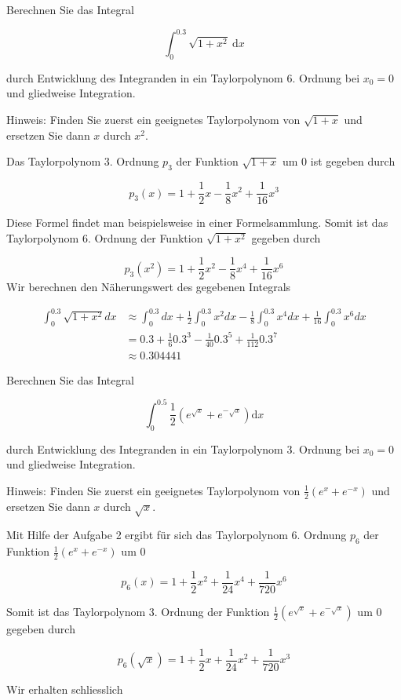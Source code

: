 \begin{example}
    Berechnen Sie das Integral

$$
\int_{0}^{0.3} \sqrt{1+x^{2}} \mathrm{~d} x
$$

durch Entwicklung des Integranden in ein Taylorpolynom 6. Ordnung bei $x_{0}=0$ und gliedweise Integration.

Hinweis: Finden Sie zuerst ein geeignetes Taylorpolynom von $\sqrt{1+x}$ und ersetzen Sie dann $x$ durch $x^{2}$.

\tcblower
Das Taylorpolynom 3. Ordnung $p_{3}$ der Funktion $\sqrt{1+x}$ um 0 ist gegeben durch

$$
p_{3}(x)=1+\frac{1}{2} x-\frac{1}{8} x^{2}+\frac{1}{16} x^{3}
$$

Diese Formel findet man beispielsweise in einer Formelsammlung. Somit ist das Taylorpolynom 6. Ordnung der Funktion $\sqrt{1+x^{2}}$ gegeben durch

$$
p_{3}\left(x^{2}\right)=1+\frac{1}{2} x^{2}-\frac{1}{8} x^{4}+\frac{1}{16} x^{6}
$$
Wir berechnen den Näherungswert des gegebenen Integrals

$$
\begin{aligned}
\int_{0}^{0.3} \sqrt{1+x^{2}} d x & \approx \int_{0}^{0.3} d x+\frac{1}{2} \int_{0}^{0.3} x^{2} d x-\frac{1}{8} \int_{0}^{0.3} x^{4} d x+\frac{1}{16} \int_{0}^{0.3} x^{6} d x \\
& =0.3+\frac{1}{6} 0.3^{3}-\frac{1}{40} 0.3^{5}+\frac{1}{112} 0.3^{7} \\
& \approx 0.304441
\end{aligned}
$$
\end{example}


\begin{example}
    Berechnen Sie das Integral

$$
\int_{0}^{0.5} \frac{1}{2}\left(e^{\sqrt{x}}+e^{-\sqrt{x}}\right) \mathrm{d} x
$$

durch Entwicklung des Integranden in ein Taylorpolynom 3. Ordnung bei $x_{0}=0$ und gliedweise Integration.

Hinweis: Finden Sie zuerst ein geeignetes Taylorpolynom von $\frac{1}{2}\left(e^{x}+e^{-x}\right)$ und ersetzen Sie dann $x$ durch $\sqrt{x}$.

\tcblower
Mit Hilfe der Aufgabe 2 ergibt für sich das Taylorpolynom 6. Ordnung $p_{6}$ der Funktion $\frac{1}{2}\left(e^{x}+e^{-x}\right)$ um 0

$$
p_{6}(x)=1+\frac{1}{2} x^{2}+\frac{1}{24} x^{4}+\frac{1}{720} x^{6}
$$

Somit ist das Taylorpolynom 3. Ordnung der Funktion $\frac{1}{2}\left(e^{\sqrt{x}}+e^{-\sqrt{x}}\right)$ um 0 gegeben durch

$$
p_{6}(\sqrt{x})=1+\frac{1}{2} x+\frac{1}{24} x^{2}+\frac{1}{720} x^{3}
$$

Wir erhalten schliesslich

\end{example}
    

